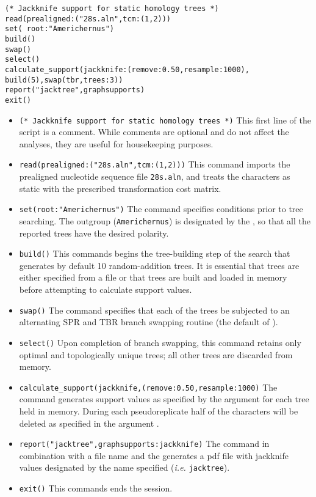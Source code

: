 \begin{verbatim}
(* Jackknife support for static homology trees *)
read(prealigned:("28s.aln",tcm:(1,2)))
set( root:"Americhernus")
build()
swap()
select()
calculate_support(jackknife:(remove:0.50,resample:1000), 
build(5),swap(tbr,trees:3))
report("jacktree",graphsupports)
exit()
\end{verbatim}

\begin{itemize}
\item \texttt{(* Jackknife support for static homology trees *)} This first line of the script is a comment. While
 comments are optional and do not affect the analyses, they are useful for housekeeping purposes.
\item \texttt{read(prealigned:("28s.aln",tcm:(1,2)))} This command imports the prealigned nucleotide sequence 
file \texttt{28s.aln}, and treats the characters as static with the prescribed transformation cost matrix.
\item \texttt{set(root:"Americhernus")} The  command specifies conditions prior to tree 
searching. The outgroup (\texttt{Americhernus}) is designated by the , so that all the reported 
trees have the desired polarity.     
\item \texttt{build()} This commands begins the tree-building step of the search that generates by default 10 
random-addition trees. It is essential that trees are either specified from a file or that trees are built and loaded in 
memory before attempting to calculate support values.
\item \texttt{swap()} The  command specifies that each of the trees be subjected to an 
alternating SPR and TBR branch swapping routine (the default of \poy).
\item \texttt{select()} Upon completion of branch swapping, this command retains only optimal and topologically 
unique trees; all other trees are discarded from memory. 
\item \texttt{calculate\_support(jackknife,(remove:0.50,resample:1000)} The  
command generates support values as specified by the  argument for each tree held in 
memory. During each pseudoreplicate half of the characters will be deleted as specified in the argument
. 
\item \texttt{report("jacktree",graphsupports:jackknife)}  The  command in combination with 
a file name and the  generates a pdf file with jackknife values designated by the 
name specified (\emph{i.e.} \texttt{jacktree}). 
\item \texttt{exit()} This commands ends the \poy session.
\end{itemize}

